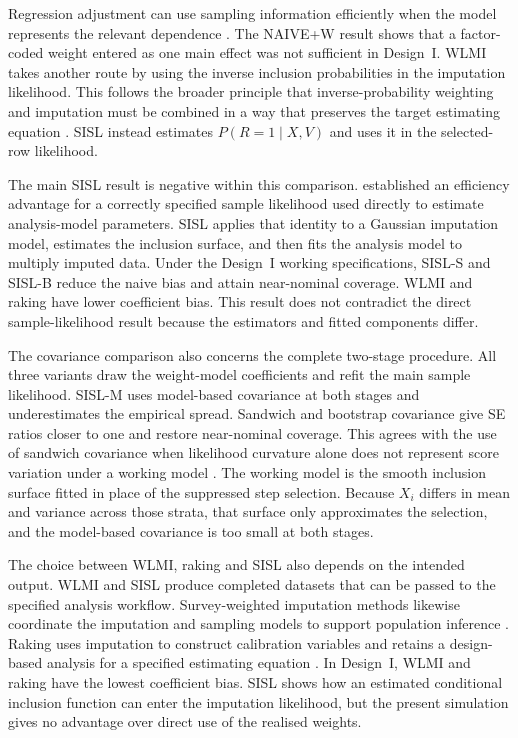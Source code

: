 Regression adjustment can use sampling information efficiently when the model represents the relevant dependence \citep{gelman2007struggles}. The NAIVE+W result shows that a factor-coded weight entered as one main effect was not sufficient in Design~I. WLMI takes another route by using the inverse inclusion probabilities in the imputation likelihood. This follows the broader principle that inverse-probability weighting and imputation must be combined in a way that preserves the target estimating equation \citep{robins1997toward,seaman2012combining}. SISL instead estimates $P(R=1\mid X,V)$ and uses it in the selected-row likelihood.

The main SISL result is negative within this comparison. \citet{pfeffermann1999parametric} established an efficiency advantage for a correctly specified sample likelihood used directly to estimate analysis-model parameters. SISL applies that identity to a Gaussian imputation model, estimates the inclusion surface, and then fits the analysis model to multiply imputed data. Under the Design~I working specifications, SISL-S and SISL-B reduce the naive bias and attain near-nominal coverage. WLMI and raking have lower coefficient bias. This result does not contradict the direct sample-likelihood result because the estimators and fitted components differ.

The covariance comparison also concerns the complete two-stage procedure. All three variants draw the weight-model coefficients and refit the main sample likelihood. SISL-M uses model-based covariance at both stages and underestimates the empirical spread. Sandwich and bootstrap covariance give SE ratios closer to one and restore near-nominal coverage. This agrees with the use of sandwich covariance when likelihood curvature alone does not represent score variation under a working model \citep{huber1967behavior,white1982maximum}. The working model is the smooth inclusion surface fitted in place of the suppressed step selection. Because $X_i$ differs in mean and variance across those strata, that surface only approximates the selection, and the model-based covariance is too small at both stages.

The choice between WLMI, raking and SISL also depends on the intended output. WLMI and SISL produce completed datasets that can be passed to the specified analysis workflow. Survey-weighted imputation methods likewise coordinate the imputation and sampling models to support population inference \citep{quartagno2020multiple}. Raking uses imputation to construct calibration variables and retains a design-based analysis for a specified estimating equation \citep{han2021combining}. In Design~I, WLMI and raking have the lowest coefficient bias. SISL shows how an estimated conditional inclusion function can enter the imputation likelihood, but the present simulation gives no advantage over direct use of the realised weights.
